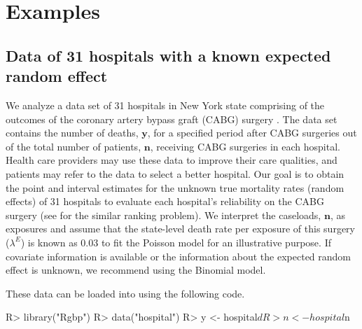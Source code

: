 \documentclass[article]{jss}
\begin{document}


\section[Examples]{Examples}\label{sec6}
\subsection[Known Second-level Mean]{Data of 31 hospitals with a known expected random effect}
\label{sec:ex:hosp}


We analyze a data set of 31 hospitals in New York state comprising of the outcomes of the coronary artery bypass graft (CABG) surgery \citep{morris2012}. The data set contains the number of deaths, $\boldsymbol{y}$, for a specified period after CABG surgeries out of the total number of patients, $\boldsymbol{n}$, receiving CABG surgeries in each hospital. Health care providers may use these data to improve their care qualities, and patients may refer to the data to select a better hospital. Our goal is to obtain the point and interval estimates for the unknown true mortality rates (random effects) of 31 hospitals to evaluate  each hospital's reliability on the CABG surgery (see \cite{morris1995} for the similar ranking problem). We interpret the caseloads, $\boldsymbol{n}$,  as exposures and assume that the state-level death rate per exposure of this surgery ($\lambda^E$) is known as 0.03 to fit the Poisson model for an illustrative purpose.  If covariate information is available or the information about the expected random effect is unknown, we recommend using the Binomial model.

These data can be loaded into  using the following code.
\begin{CodeChunk}
\begin{CodeInput}
R> library("Rgbp")
R> data("hospital")
R> y <- hospital$d
R> n <- hospital$n
\end{CodeInput}
\end{CodeChunk}
\end{document}
